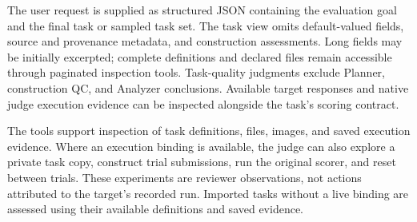 \documentclass{article} %
\begin{document}
The user request is supplied as structured JSON containing the evaluation goal
and the final task or sampled task set. The task view omits default-valued fields,
source and provenance metadata, and construction assessments. Long fields may be
initially excerpted; complete definitions and declared files remain accessible
through paginated inspection tools. Task-quality judgments exclude Planner,
construction QC, and Analyzer conclusions. Available target responses and native
judge execution evidence can be inspected alongside the task's scoring contract.

The tools support inspection of task definitions, files, images, and saved
execution evidence. Where an execution binding is available, the judge can also
explore a private task copy, construct trial submissions, run the original
scorer, and reset between trials. These experiments are reviewer observations,
not actions attributed to the target's recorded run. Imported tasks without a
live binding are assessed using their available definitions and saved evidence.
\end{document}
